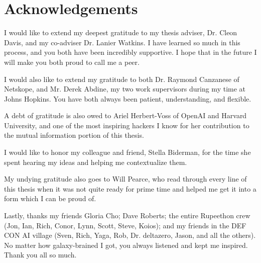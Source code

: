\chapter*{Acknowledgements}

I would like to extend my deepest gratitude to my thesis adviser, Dr. Cleon Davis, and my co-adviser Dr. Lanier Watkins.
I have learned so much in this process, and you both have been incredibly supportive. 
I hope that in the future I will make you both proud to call me a peer.

I would also like to extend my gratitude to both Dr. Raymond Canzanese of Netskope, and Mr. Derek Abdine, my two work supervisors during my time at Johns Hopkins.
You have both always been patient, understanding, and flexible.

A debt of gratitude is also owed to Ariel Herbert-Voss of OpenAI and Harvard University, and one of the most inspiring hackers I know for her contribution to the mutual information portion of this thesis.

I would like to honor my colleague and friend, Stella Biderman, for the time she spent hearing my ideas and helping me contextualize them. 

My undying gratitude also goes to Will Pearce, who read through every line of this thesis when it was not quite ready for prime time and helped me get it into a form which I can be proud of.

Lastly, thanks my friends Gloria Cho; Dave Roberts; the entire Rupeethon crew (Jon, Ian, Rich, Conor, Lynn, Scott, Steve, Koios); and my friends in the DEF CON AI village (Sven, Rich, Yaga, Rob, Dr. deltazero, Jason, and all the others). 
No matter how galaxy-brained I got, you always listened and kept me inspired.
Thank you all so much.